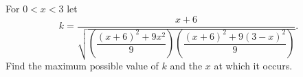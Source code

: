 For $0<x<3$ let
\[k=\dfrac{x+6}{\sqrt{\left(\dfrac{(x+6)^2+9x^2}{9}\right)\left(\dfrac{(x+6)^2+9(3-x)^2}{9}\right)}}.\]
Find the maximum possible value of $k$ and the $x$ at which it occurs.
